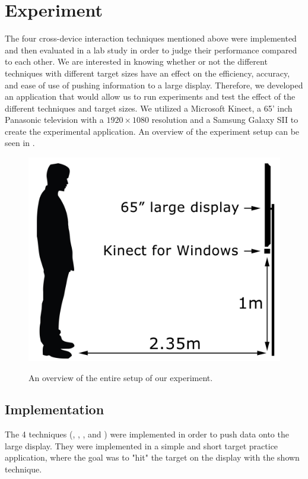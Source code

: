 \section{Experiment} \label{sec:experiment}
The four cross-device interaction techniques mentioned above were implemented and then evaluated in a lab study in order to judge their performance compared to each other. 
We are interested in knowing whether or not the different techniques with different target sizes have an effect on the efficiency, accuracy, and ease of use of pushing information to a large display. Therefore, we developed an application that would allow us to run experiments and test the effect of the different techniques and target sizes. 
We utilized a Microsoft Kinect, a 65' inch Panasonic television with a $1920 \times 1080$ resolution and a Samsung Galaxy SII to create the experimental application. 
An overview of the experiment setup can be seen in . 

\begin{figure}[H]
	\centering
	{\includegraphics[width = 0.7\columnwidth]{images/SetupIllustration.jpg}}
	\caption{
		\protect An overview of the entire setup of our experiment.
	}
	\label{fig:entireSetup}
\end{figure}

\subsection{Implementation}

The 4 techniques (\pinch, \swipe, \throw, and \tilt) were implemented in order to push data onto the large display. 
They were implemented in a simple and short target practice application, where the goal was to "hit" the target on the display with the shown technique. 


